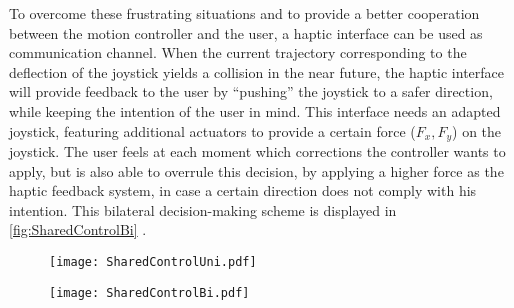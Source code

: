 To overcome these frustrating situations and to provide a better cooperation between the motion controller and the user, a haptic interface can be used as communication channel. When the current trajectory corresponding to the deflection of the joystick yields a collision in the near future, the haptic interface will provide feedback to the user by ``pushing'' the joystick to a safer direction, while keeping the intention of the user in mind. This interface needs an adapted joystick, featuring additional actuators to provide a certain force ($F_x, F_y$) on the joystick. The user feels at each moment which corrections the controller wants to apply, but is also able to overrule this decision, by applying a higher force as the haptic feedback system, in case a certain direction does not comply with his intention. This bilateral decision-making scheme is displayed in \cref{fig:SharedControlBi} \cite{VanderPoortenEtAl2012a}. 

\begin{figure}[!htbp]
\centering
	\begin{minipage}[b]{.45\linewidth}
		\centering
		\texttt{[image: SharedControlUni.pdf]}
	\end{minipage}
	\hfill%
	\centering
	\begin{minipage}[b]{.45\linewidth}
		\centering
		\texttt{[image: SharedControlBi.pdf]}
	\end{minipage}\\[-7pt]
	\begin{minipage}[t]{.45\linewidth}
	\end{minipage}
	\hfill
	\begin{minipage}[t]{.45\linewidth}
	\end{minipage}
\end{figure}

